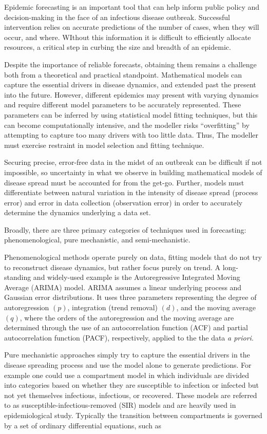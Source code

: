 Epidemic forecasting is an important tool that can help inform public policy and decision-making in the face of an infectious disease outbreak. Successful intervention relies on accurate predictions of the number of cases, when they will occur, and where. WIthout this information it is difficult to efficiently allocate resources, a critical step in curbing the size and breadth of an epidemic.

Despite the importance of reliable forecasts, obtaining them remains a challenge both from a theoretical and practical standpoint. Mathematical models can capture the essential drivers in disease dynamics, and extended past the present into the future. However, different epidemics may present with varying dynamics and require different model parameters to be accurately represented. These parameters can be inferred by using statistical model fitting techniques, but this can become computationally intensive, and the modeller risks ``overfitting'' by attempting to capture too many drivers with too little data. Thus, The modeller must exercise restraint in model selection and fitting technique.

Securing precise, error-free data in the midst of an outbreak can be difficult if not impossible, so uncertainty in what we observe in building mathematical models of disease spread must be accounted for from the get-go. Further, models must differentiate between natural variation in the intensity of disease spread (process error) and error in data collection (observation error) in order to accurately determine the dynamics underlying a data set.

Broadly, there are three primary categories of techniques used in forecasting: phenomenological, pure mechanistic, and semi-mechanistic.

Phenomenological methods operate purely on data, fitting models that do not try to reconstruct disease dynamics, but rather focus purely on trend. A long-standing and widely-used example is the Autoregressive Integrated Moving Average (ARIMA) model. ARIMA assumes a linear underlying process and Gaussian error distributions. It uses three parameters representing the degree of autoregression $(p)$, integration (trend removal) $(d)$, and the moving average $(q)$, where the orders of the autoregression and the moving average are determined through the use of an autocorrelation function (ACF) and partial autocorrelation function (PACF), respectively, applied to the the data \textit{a priori}.

Pure mechanistic approaches simply try to capture the essential drivers in the disease spreading process and use the model alone to generate predictions. For example one could use a compartment model in which individuals are divided into categories based on whether they are susceptible to infection or infected but not yet themselves infectious, infectious, or recovered. These models are referred to as susceptible-infectious-removed (SIR) models and are heavily used in epidemiological study. Typically the transition between compartments is governed by a set of ordinary differential equations, such as 

